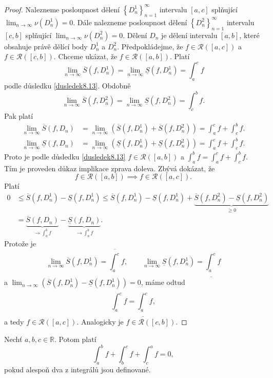 \begin{proof}
	Nalezneme posloupnost dělení $\left \{ D_n^1 \right \}_{n=1}^\infty $ intervalu $[a,c]$ splňující
	$\lim_{n \to \infty} \nu (D_n^1) = 0$. Dále nalezneme posloupnost dělení $\left \{ D_n^2 \right \}_{n=1}^\infty $
	intervalu $[c,b]$ splňující $\lim_{n \to \infty} \nu(D_n^2)=0$. Dělení $D_n$ je dělení intervalu $[a,b]$, které
	obsahuje právě dělící body $D_n^1$ a $D_n^2$. Předpokládejme, že $f\in \mathcal R([a,c])$ a
	$f \in \mathcal R([c,b])$. Chceme ukázat, že $f\in \mathcal R([a,b])$. Platí
	$$
 \lim_{n \to \infty} \overline S(f,D_n^1) = \lim_{n \to \infty} \underline S(f,D_n^1) = \int _a^c f
	$$
	podle důsledku \ref{dusledek8.13}. Obdobně
	$$
 \lim_{n \to \infty} \overline S(f,D_n^2) = \lim_{n \to \infty} \underline S(f,D_n^2) = \int _c^b f.
	$$
	Pak platí
	\begin{align*}
	\lim_{n \to \infty} \overline S(f,D_n)&=\lim_{n \to \infty} (\overline S(f,D_n^1)+ \overline S(f,D_n^2)) = \int_a^c f + \int_c^b f.\\
	\lim_{n \to \infty} \underline S(f,D_n) &= \lim_{n \to \infty} (\underline S(f,D_n^1) + \underline S(f,D_n^2)) = \int_a^c f + \int_c^b f.
\end{align*}
Proto je podle důsledku \ref{dusledek8.13} $f \in \mathcal R([a,b])$ a $\int_a^b f = \int_a^c f + \int_c^b f$.
Tím je proveden důkaz implikace zprava doleva. Zbývá dokázat, že
$$
    f \in \mathcal R([a,b]) \implies f\in \mathcal R([a,c]).
$$
Platí
\begin{align*}
0&\leq\overline S(f,D_n^1) - \underline S(f,D_n^1) \leq \overline S(f,D_n^1) - \underline S(f,D_n^1) + \underbrace{\overline S(f,D_n^2)-\underline S(f,D_n^2)}_{\geq 0}\\
&= \underbrace{\overline S(f,D_n)}_{\to \int_a^b f} - \underbrace{\underline S(f,D_n)}_{\to\int_a^b f}.
\end{align*}
Protože je
$$
\lim_{n \to \infty} \overline S (f,D_n^1) = \overline{\int_a^c} f, \qquad \lim_{n \to \infty} \underline S(f,D_n^1)=\underline{\int_a^c} f
$$
a $\lim_{n \to \infty} (\overline S(f,D_n^1) - \underline S(f,D_n^1))= 0$, máme odtud
$$
    \overline{ \int_a^c} f = \underline{\int_a^c} f ,
$$
a tedy $f \in \mathcal R([a,c])$. Analogicky je $f \in \mathcal R([c,b])$.
\end{proof}

\begin{poznamka}
	Nechť $a,b,c \in \mathbb R $. Potom platí
	$$
	    \int_a^b f + \int_b^c f + \int _c^a f=0,
	$$
	pokud alespoň dva z integrálů jsou definované.
\end{poznamka}


